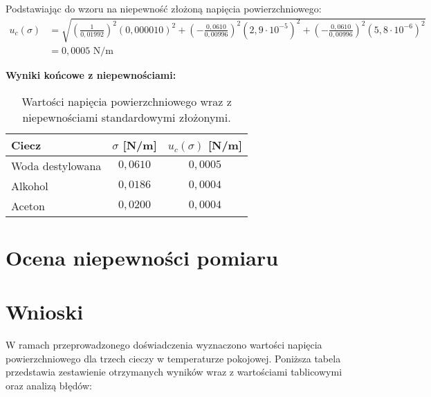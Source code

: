 \documentclass[a4paper,12pt]{article}
\begin{document}
Podstawiając do wzoru na niepewność złożoną napięcia powierzchniowego:
\begin{align*}
    u_c(\sigma) & = \sqrt{\left(\frac{1}{0{,}01992}\right)^2 (0{,}000010)^2 + \left(-\frac{0{,}0610}{0{,}00996}\right)^2 (2{,}9 \cdot 10^{-5})^2 + \left(-\frac{0{,}0610}{0{,}00996}\right)^2 (5{,}8 \cdot 10^{-6})^2} \\
                & = 0{,}0005 \text{ N/m}
\end{align*}

\noindent\textbf{Wyniki końcowe z niepewnościami:}

\begin{table}[H]
    \centering
    \begin{tabular}{|l|c|c|}
        \hline
        \textbf{Ciecz} & \textbf{$\sigma$ [N/m]} & \textbf{$u_c(\sigma)$ [N/m]} \\
        \hline
        Woda destylowana & $0{,}0610$ & $0{,}0005$ \\
        \hline
        Alkohol & $0{,}0186$ & $0{,}0004$ \\
        \hline
        Aceton & $0{,}0200$ & $0{,}0004$ \\
        \hline
    \end{tabular}
    \caption{Wartości napięcia powierzchniowego wraz z niepewnościami standardowymi złożonymi.}
    \label{tab:wyniki_z_niepewnosciami}
\end{table}

\section{Ocena niepewności pomiaru}

\section{Wnioski}

W ramach przeprowadzonego doświadczenia wyznaczono wartości napięcia powierzchniowego dla trzech cieczy w temperaturze pokojowej. Poniższa tabela przedstawia zestawienie otrzymanych wyników wraz z wartościami tablicowymi oraz analizą błędów:
\end{document}
